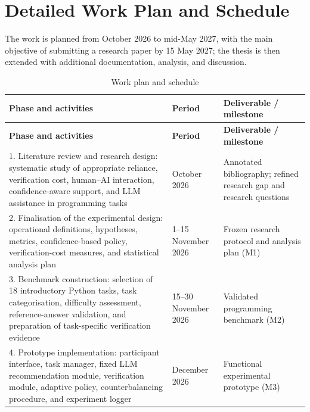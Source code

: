 \documentclass[oneside,final,14pt,a4paper]{extreport}
\begin{document}
\section{Detailed Work Plan and Schedule}
\label{sec:workplan}

The work is planned from October 2026 to mid-May 2027, with the main objective
of submitting a research paper by 15 May 2027; the thesis is then extended
with additional documentation, analysis, and discussion.

\begin{longtable}{p{8.0cm}p{2.4cm}p{5.3cm}}
\caption{Work plan and schedule}
\label{tab:workplan} \\
\toprule
\textbf{Phase and activities} & \textbf{Period} &
\textbf{Deliverable / milestone} \\
\midrule
\endfirsthead

\toprule
\textbf{Phase and activities} & \textbf{Period} &
\textbf{Deliverable / milestone} \\
\midrule
\endhead

\bottomrule
\endfoot

1. Literature review and research design:
systematic study of appropriate reliance, verification cost,
human--AI interaction, confidence-aware support, and LLM assistance
in programming tasks &
October 2026 &
Annotated bibliography; refined research gap and research questions \\

2. Finalisation of the experimental design:
operational definitions, hypotheses, metrics, confidence-based policy,
verification-cost measures, and statistical analysis plan &
1--15 November 2026 &
Frozen research protocol and analysis plan (M1) \\

3. Benchmark construction:
selection of 18 introductory Python tasks, task categorisation,
difficulty assessment, reference-answer validation, and preparation
of task-specific verification evidence &
15--30 November 2026 &
Validated programming benchmark (M2) \\

4. Prototype implementation:
participant interface, task manager, fixed LLM recommendation module,
verification module, adaptive policy, counterbalancing procedure,
and experiment logger &
December 2026 &
Functional experimental prototype (M3) \\


\end{longtable}
\end{document}
